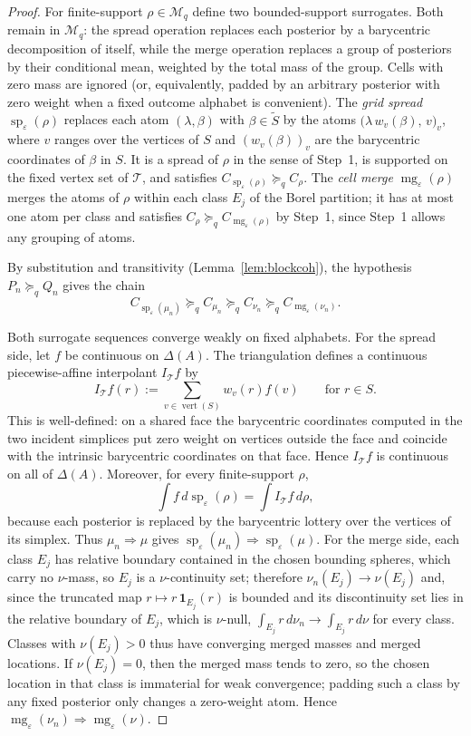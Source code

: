 \documentclass[11pt,a4paper]{article}
\theoremstyle{definition}
\newcommand{\1}{\mathbf 1}
\begin{document}
\begin{proof}
For finite-support $\rho\in\mathcal M_q$ define two bounded-support surrogates.  Both remain in
$\mathcal M_q$: the spread operation replaces each posterior by a barycentric decomposition of itself, while the merge
operation replaces a group of posteriors by their conditional mean, weighted by the total mass of the group.  Cells with
zero mass are ignored (or, equivalently, padded by an arbitrary posterior with zero weight when a fixed outcome alphabet is
convenient).
The \emph{grid spread} $\operatorname{sp}_\varepsilon(\rho)$ replaces each atom $(\lambda,\beta)$ with
$\beta\in\widetilde S$ by the atoms $\bigl(\lambda\,w_v(\beta),\,v\bigr)_{v}$, where $v$ ranges over the vertices of
$S$ and $(w_v(\beta))_v$ are the barycentric coordinates of $\beta$ in $S$.  It is a spread of $\rho$ in the sense of
Step~1, is supported on the fixed vertex set of $\mathcal T$, and satisfies
$C_{\operatorname{sp}_\varepsilon(\rho)}\succeq_q C_\rho$.
The \emph{cell merge} $\operatorname{mg}_\varepsilon(\rho)$ merges the atoms of $\rho$ within each class $E_j$ of the
Borel partition; it has at most one atom per class and satisfies
$C_\rho\succeq_q C_{\operatorname{mg}_\varepsilon(\rho)}$ by Step~1, since Step~1 allows any grouping of atoms.

By substitution and transitivity (Lemma~\ref{lem:blockcoh}), the hypothesis $P_n\succeq_q Q_n$ gives the chain
\[
C_{\operatorname{sp}_\varepsilon(\mu_n)}
\succeq_q
C_{\mu_n}
\succeq_q
C_{\nu_n}
\succeq_q
C_{\operatorname{mg}_\varepsilon(\nu_n)}.
\]

Both surrogate sequences converge weakly on fixed alphabets.  For the spread side, let $f$ be continuous on
$\Delta(A)$.  The triangulation defines a continuous piecewise-affine interpolant $I_{\mathcal T}f$ by
\[
I_{\mathcal T}f(r):=\sum_{v\in\operatorname{vert}(S)}w_v(r)f(v)
\qquad\text{for }r\in S.
\]
This is well-defined: on a shared face the barycentric coordinates computed in the two incident simplices put zero
weight on vertices outside the face and coincide with the intrinsic barycentric coordinates on that face.  Hence
$I_{\mathcal T}f$ is continuous on all of $\Delta(A)$.  Moreover, for every finite-support $\rho$,
\[
\int f\,d\operatorname{sp}_\varepsilon(\rho)
= \int I_{\mathcal T}f\,d\rho,
\]
because each posterior is replaced by the barycentric lottery over the vertices of its simplex.  Thus
$\mu_n\Rightarrow\mu$ gives
$\operatorname{sp}_\varepsilon(\mu_n)\Rightarrow\operatorname{sp}_\varepsilon(\mu)$.  For the merge side, each class
$E_j$ has relative boundary contained in the chosen bounding spheres, which carry no $\nu$-mass, so $E_j$ is a
$\nu$-continuity set; therefore
$\nu_n(E_j)\to\nu(E_j)$ and, since the truncated map $r\mapsto r\,\1_{E_j}(r)$ is bounded and its discontinuity set
lies in the relative boundary of $E_j$, which is $\nu$-null,
$\int_{E_j}r\,d\nu_n\to\int_{E_j}r\,d\nu$ for every
class.  Classes with $\nu(E_j)>0$ thus have converging merged masses and merged locations.  If $\nu(E_j)=0$, then the
merged mass tends to zero, so the chosen location in that class is immaterial for weak convergence; padding such a class
by any fixed posterior only changes a zero-weight atom.  Hence
$\operatorname{mg}_\varepsilon(\nu_n)\Rightarrow\operatorname{mg}_\varepsilon(\nu)$.


\end{proof}
\end{document}
